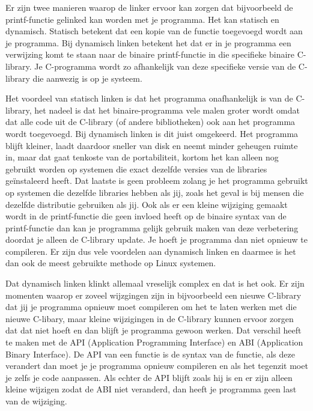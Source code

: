 Er zijn twee manieren waarop de linker ervoor kan zorgen dat bijvoorbeeld de printf-functie gelinked kan worden met je programma. Het
kan statisch en dynamisch. Statisch betekent dat een kopie van de functie toegevoegd wordt aan je programma. Bij dynamisch linken betekent het dat er in je programma een verwijzing
komt te staan naar de binaire printf-functie in die specifieke binaire C-library. Je C-programma wordt zo afhankelijk van deze specifieke
versie van de C-library die aanwezig is op je systeem.

Het voordeel van statisch linken is dat het programma onafhankelijk is van de C-library, het nadeel is dat het binaire-programma vele malen groter wordt omdat dat alle code uit de C-library (of andere bibliotheken) ook aan het programma wordt toegevoegd. Bij dynamisch linken is dit juist omgekeerd. Het programma blijft kleiner, laadt daardoor sneller van disk en neemt minder geheugen ruimte in, maar dat gaat tenkoste van de portabiliteit, kortom het kan alleen nog gebruikt worden op systemen die exact dezelfde versies van de libraries ge\"instaleerd heeft.
Dat laatste is geen probleem zolang je het programma gebruikt op
systemen die dezelfde libraries hebben als jij, zoals het geval is bij mensen die dezelfde distributie gebruiken als
jij. Ook als er een kleine wijziging gemaakt wordt in de printf-functie die geen invloed heeft op de binaire syntax van de printf-functie
dan kan je programma gelijk gebruik maken van deze verbetering doordat je alleen de C-library update. Je hoeft je
programma dan niet opnieuw te compileren. Er zijn dus vele voordelen aan dynamisch linken en daarmee is het dan ook de meest gebruikte methode op Linux systemen.

Dat dynamisch linken klinkt allemaal vreselijk complex en dat is het ook. Er zijn momenten waarop er zoveel wijzgingen zijn in bijvoorbeeld een nieuwe C-library dat jij je programma opnieuw moet compileren om het te laten werken met die nieuwe C-libary, maar kleine wijzigingen in de C-library kunnen ervoor zorgen dat dat niet hoeft en dan blijft je programma gewoon werken. Dat verschil heeft te maken met de API (Application Programming Interface) en ABI (Application Binary Interface). De API van een functie is de syntax van de functie, als deze
verandert dan moet je je programma opnieuw compileren en als het tegenzit moet je zelfs je code aanpassen. Als echter de API blijft zoals hij is en er zijn alleen kleine wijzigen zodat de ABI niet veranderd, dan heeft je programma geen last van de wijziging.


